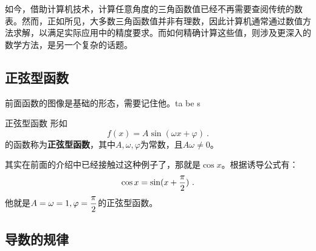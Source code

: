 如今，借助计算机技术，计算任意角度的三角函数值已经不再需要查阅传统的数表。然而，正如所见，大多数三角函数值并非有理数，因此计算机通常通过数值方法求解，以满足实际应用中的精度要求。而如何精确计算这些值，则涉及更深入的数学方法，是另一个复杂的话题。

\subsection{正弦型函数}

前面函数的图像是基础的形态，需要记住他。ta be s

\begin{definition}{正弦型函数}
形如
\begin{equation}
f(x)=A\sin(\omega x+\varphi)~.
\end{equation}
的函数称为\textbf{正弦型函数}，其中$A,\omega,\varphi$为常数，且$A\omega\neq0$。
\end{definition}
其实在前面的介绍中已经接触过这种例子了，那就是$\cos x$。根据诱导公式有：
\begin{equation}
\cos x=\sin(x+{\pi\over2})~.
\end{equation}
他就是$\displaystyle A=\omega=1,\varphi={\pi\over2}$的正弦型函数。


\subsection{导数的规律}